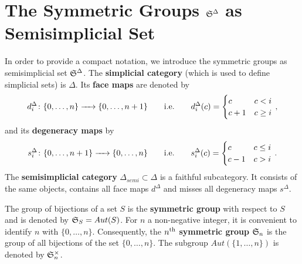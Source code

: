 \section{The Symmetric Groups \texorpdfstring{$\mathfrak S^\Delta$}{SDelta} as Semisimplicial Set}
\label{notation:semi_simpl_sym_grp}
In order to provide a compact notation, we introduce the symmetric groups as semisimplicial set $\mathfrak S^\Delta$.
\label{page:simplicial_category}%
The {\bf simplicial category} (which is used to define simplicial sets) is $\Delta$.
\label{page:simplicial_face}%
Its {\bf face maps} are denoted by
\[
    d^\Delta_i \colon \{0, \ldots, n\} \to \{0, \ldots, n+1\} \mspc{i.e.}{20} d^\Delta_i(c) = \begin{cases} c & c < i \\ c+1 & c \ge i \end{cases}\,,
\]
\label{page:simplicial_degeneracy}%
and its {\bf degeneracy maps} by
\[
    s^\Delta_i \colon \{0, \ldots, n+1\} \to \{0, \ldots, n\} \mspc{i.e.}{20} s^\Delta_i(c) = \begin{cases} c & c \le i \\ c-1 & c > i \end{cases} \,.
\]
\label{page:semisimplicial_category}%
The {\bf semisimplicial category} $\Delta_{semi} \subset \Delta$ is a faithful subcategory.
It consists of the same objects, contains all face maps $d^\Delta$ and misses all degeneracy maps $s^\Delta$.

\begin{defi}
    \label{notation:sym_grp}
    The group of bijections of a set $S$ is the {\bf symmetric group} with respect to $S$ and is denoted by $\mathfrak S_{S} = Aut(S)$.
    For $n$ a non-negative integer, it is convenient to identify $n$ with $\{0, \ldots, n\}$.
    Consequently, the $n^{\text{th}}$ {\bf symmetric group} $\mathfrak S_n$ is the group of all bijections of the set $\{ 0, \ldots, n\}$.
    The subgroup $Aut(\{ 1, \ldots, n\})$ is denoted by $\mathfrak S_n^\times$.
\end{defi}

